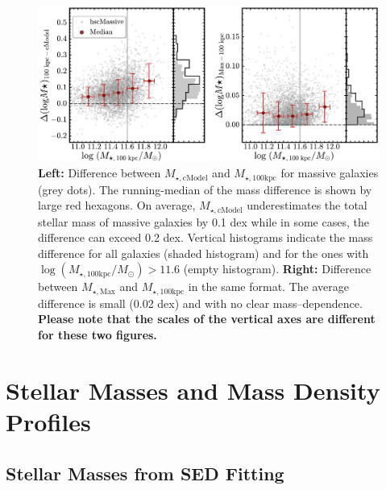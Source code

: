 \documentclass[a4paper,fleqn,usenatbib]{mnras}
\def\mtot{{$M_{\star,100\mathrm{kpc}}$}}
\def\mmax{{$M_{\star,\mathrm{Max}}$}}
\def\mcmodel{{$M_{\star,\mathrm{cModel}}$}}
\def\logmtot{{$\log (M_{\star,100\mathrm{kpc}}/M_{\odot})$}}
\begin{document}
  \begin{figure}
      \centering 
      \includegraphics[width=\textwidth]{fig/redbcg_mass_diff_new}
      \caption{              
          \textbf{Left:} Difference between \mcmodel{} and \mtot{} for massive
      	  galaxies (grey dots).
      	  The running-median of the mass difference is shown by large red hexagons. 
      	  On average, \mcmodel{} underestimates the total stellar mass of massive 
          galaxies by 0.1 dex while in some cases, the difference can exceed 0.2 dex.
          Vertical histograms indicate the mass difference for all galaxies (shaded 
          histogram) and for the ones with \logmtot{}$>11.6$ (empty histogram).
          \textbf{Right:} Difference between \mmax{} and \mtot{} in the same format. 
          The average difference is small (0.02 dex) and with no clear mass--dependence. 
          \textbf{Please note that the scales of the vertical axes are different 
            for these two figures.}
          }
      \label{fig:mass_diff}
  \end{figure}
          
    
\section{Stellar Masses and Mass Density Profiles}
    \label{sec:mstar}
    
\subsection{Stellar Masses from SED Fitting}
    \label{ssec:isedfit}
   
\end{document}
